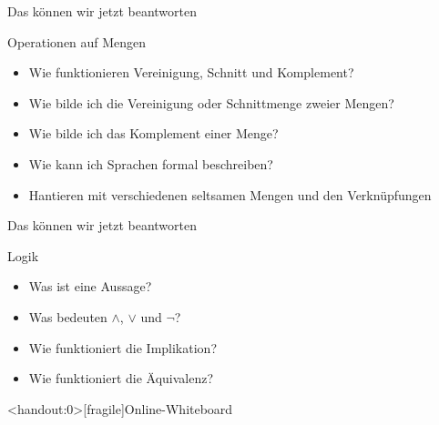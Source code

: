 \begin{frame}[fragile]{Das können wir jetzt beantworten}
    \begin{alertblock}{Operationen auf Mengen}
    \begin{itemize}
        \item Wie funktionieren Vereinigung, Schnitt und Komplement?
        \item Wie bilde ich die Vereinigung oder Schnittmenge zweier Mengen?
        \item Wie bilde ich das Komplement einer Menge?
        \item Wie kann ich Sprachen formal beschreiben?
        \item Hantieren mit verschiedenen seltsamen Mengen und den Verknüpfungen
    \end{itemize}
    \end{alertblock}
\end{frame}

\begin{frame}[fragile]{Das können wir jetzt beantworten}
	\begin{alertblock}{Logik}
		\begin{itemize}
			\item Was ist eine Aussage?
			\item Was bedeuten $\wedge$, $\vee$ und $\neg$?
			\item Wie funktioniert die Implikation?
			\item Wie funktioniert die Äquivalenz?
		\end{itemize}
	\end{alertblock}
\end{frame}




\appendix
\begin{frame}<handout:0>[fragile]{Online-Whiteboard}
	\phantom{text}
\end{frame}


